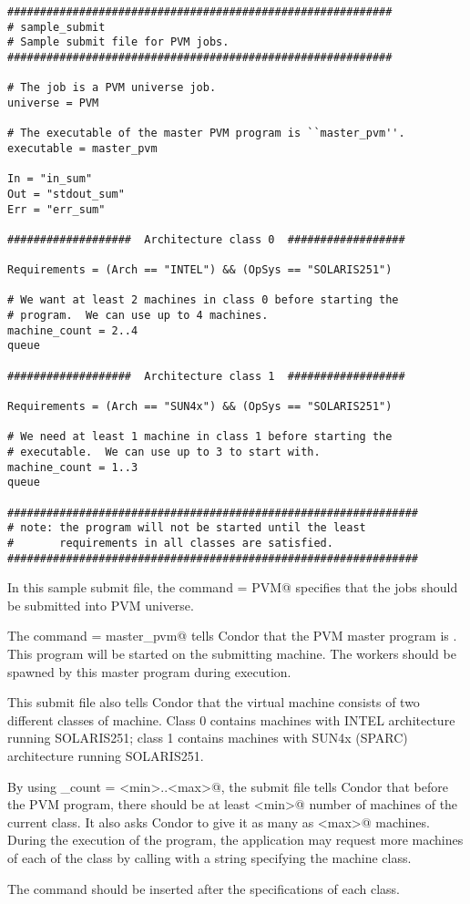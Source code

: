 \CondorSmall
\begin{verbatim}
###########################################################
# sample_submit
# Sample submit file for PVM jobs. 
###########################################################

# The job is a PVM universe job.
universe = PVM  

# The executable of the master PVM program is ``master_pvm''.
executable = master_pvm

In = "in_sum"
Out = "stdout_sum"
Err = "err_sum"

###################  Architecture class 0  ##################

Requirements = (Arch == "INTEL") && (OpSys == "SOLARIS251") 

# We want at least 2 machines in class 0 before starting the 
# program.  We can use up to 4 machines.
machine_count = 2..4  
queue

###################  Architecture class 1  ##################

Requirements = (Arch == "SUN4x") && (OpSys == "SOLARIS251") 

# We need at least 1 machine in class 1 before starting the 
# executable.  We can use up to 3 to start with.
machine_count = 1..3
queue

###############################################################
# note: the program will not be started until the least 
#       requirements in all classes are satisfied.
###############################################################
\end{verbatim}
\normalsize


In this sample submit file, the command \verb@universe = PVM@
specifies that the jobs should be submitted into PVM universe.

The command \verb@executable = master_pvm@ tells Condor that the PVM
master program is .  This program will be started on
the submitting machine.  The workers should be spawned by this master
program during execution.

This submit file also tells Condor that the virtual machine
consists of two different classes of machine.  Class
0 contains machines with INTEL architecture running SOLARIS251; class
1 contains machines with SUN4x (SPARC) architecture running SOLARIS251.

By using \verb@machine_count = <min>..<max>@, the submit file tells
Condor that before the PVM program, there should be at least \verb@<min>@
number of machines of the current class.  It also asks Condor to give
it as many as \verb@<max>@ machines.  During the execution of the program,
the application may request more machines of each of the class by calling
 with a string specifying the machine
class.

The  command should be inserted after the specifications of
each class.

